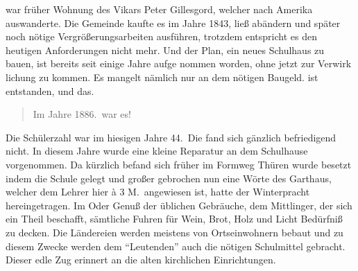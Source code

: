 

%
war früher Wohnung des Vikars Peter Gillesgord\unsicher,\ob
welcher nach Amerika auswanderte. Die Gemeinde\ob
kaufte es im Jahre 1843, ließ abändern und\ob
später noch nötige Vergrößerungsarbeiten ausführen,\ob
trotzdem entspricht es den heutigen Anforderungen\ob
nicht mehr. Und der Plan, ein neues Schulhaus\ob
zu bauen, ist bereits seit einige Jahre aufge\ohb
nommen worden, ohne jetzt zur Verwirk\ohb
lichung zu kommen. Es mangelt nämlich\ob
nur an dem nötigen Baugeld.\ob
\unsicher ist entstanden, und das\unsicher.

\pend
\begin{verse}
Im Jahre 1886.\ war es!
\end{verse}
\pstart

Die Schülerzahl war im hiesigen Jahre 44.\ Die fand sich\ob
gänzlich befriedigend nicht. In diesem Jahre wurde eine\ob
kleine Reparatur an dem Schulhause vorgenommen.\ob
Da kürzlich befand sich früher im Formweg Thüren\ob
wurde besetzt indem die Schule gelegt und großer\ob
gebrochen nun eine Wörte des Garthaus, welcher\ob
{}%
dem Lehrer hier à 3 M.\ angewiesen ist,\ob
hatte der Winterpracht hereingetragen. Im Oder\unsicher\ob
Genuß der üblichen Gebräuche, dem Mittlinger\unsicher, der\ob
sich ein Theil beschafft, sämtliche Fuhren\ob
für Wein, Brot, Holz und Licht Bedürfniß zu decken.\ob
Die Ländereien werden meistens von Ortseinwohnern bebaut\ob
und zu diesem Zwecke werden dem \enquote{Leutenden} auch die\ob
nötigen Schulmittel gebracht. Dieser edle Zug\ob
erinnert an die alten kirchlichen Einrichtungen.
\pend
